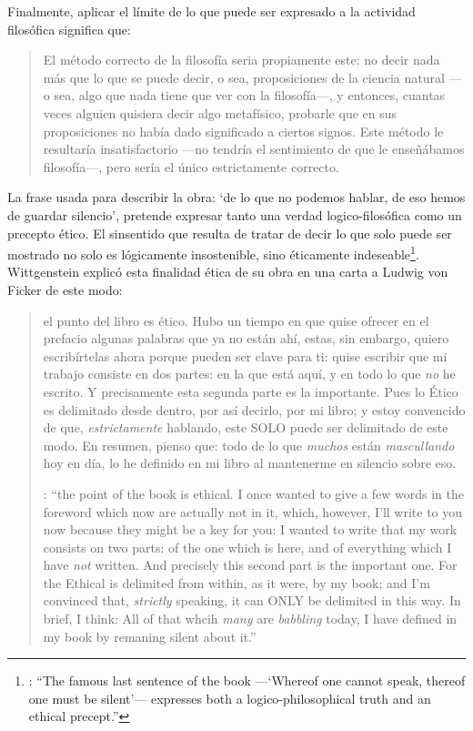 Finalmente, aplicar el límite de lo que puede ser expresado a la actividad filosófica significa que: \blockquote[{\cite[\S6.53]{wittgenstein1922tractatuses}}]{El método correcto de la filosofía seria propiamente este: no decir nada más que lo que se puede decir, o sea, proposiciones de la ciencia natural ---o sea, algo que nada tiene que ver con la filosofía---, y entonces, cuantas veces alguien quisiera decir algo metafísico, probarle que en sus proposiciones no había dado significado a ciertos signos. Este método le resultaría insatisfactorio ---no tendría el sentimiento de que le enseñábamos filosofía---, pero sería el único estrictamente correcto.} La frase usada para describir la obra: \enquote*{de lo que no podemos hablar, de eso hemos de guardar silencio}, pretende expresar tanto una verdad logico-filosófica como un precepto ético. El sinsentido que resulta de tratar de decir lo que solo puede ser mostrado no solo es lógicamente insostenible, sino éticamente indeseable\footnote{\cite[Cf.~][156]{monk1991duty}: \enquote{The famous last sentence of the book ---`Whereof one cannot speak, thereof one must be silent'--- expresses both a logico-philosophical truth and an ethical precept.}}. Wittgenstein explicó esta finalidad ética de su obra en una carta a Ludwig von Ficker de este modo:
\blockquote[{\cite[22--23]{monk2005howto}}: \enquote{the point of the book is ethical. I once wanted to give a few words in the foreword which now are actually not in it, which, however, I'll write to you now because they might be a key for you: I wanted to write that my work consists on two parts: of the one which is here, and of everything which I have \emph{not} written. And precisely this second part is the important one. For the Ethical is delimited from within, as it were, by my book; and I'm convinced that, \emph{strictly} speaking, it can ONLY be delimited in this way. In brief, I think: All of that whcih \emph{many} are \emph{babbling} today, I have defined in my book by remaning silent about it.}]{el punto del libro es ético. Hubo un tiempo en que quise ofrecer en el prefacio algunas palabras que ya no están ahí, estas, sin embargo, quiero escribírtelas ahora porque pueden ser clave para ti: quise escribir que mi trabajo consiste en dos partes: en la que está aquí, y en todo lo que \emph{no} he escrito. Y precisamente esta segunda parte es la importante. Pues lo Ético es delimitado desde dentro, por así decirlo, por mi libro; y estoy convencido de que, \emph{estrictamente} hablando, este SOLO puede ser delimitado de este modo. En resumen, pienso que: todo de lo que \emph{muchos} están \emph{mascullando} hoy en día, lo he definido en mi libro al mantenerme en silencio sobre eso.}

